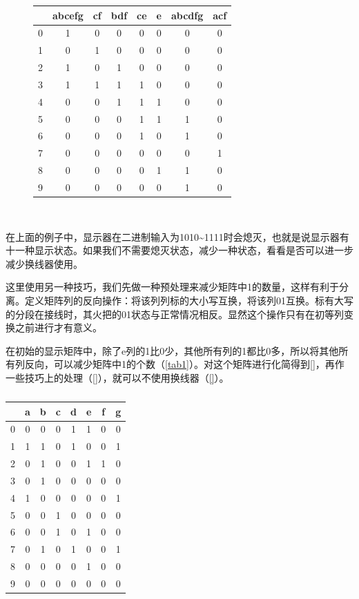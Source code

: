 \begin{figure}[p]
{\begin{tabular}{|c|ccccccc|}
&abcefg&cf&bdf&ce&e&abcdfg&acf\\\hline
0&1&0&0&0&0&0&0\\
1&0&1&0&0&0&0&0\\
2&1&0&1&0&0&0&0\\
3&1&1&1&1&0&0&0\\
4&0&0&1&1&1&0&0\\
5&0&0&0&1&1&1&0\\
6&0&0&0&1&0&1&0\\
7&0&0&0&0&0&0&1\\
8&0&0&0&0&1&1&0\\
9&0&0&0&0&0&1&0
\end{tabular}
}\\
\caption{}
\label{bianhuanp2}
\end{figure}

在上面的例子中，显示器在二进制输入为1010\~{}1111时会熄灭，也就是说显示器有十一种显示状态。如果我们不需要熄灭状态，减少一种状态，看看是否可以进一步减少换线器使用。

这里使用另一种技巧，我们先做一种预处理来减少矩阵中1的数量，这样有利于分离。定义矩阵列的反向操作：将该列列标的大小写互换，将该列01互换。标有大写的分段在接线时，其火把的01状态与正常情况相反。显然这个操作只有在初等列变换之前进行才有意义。

在初始的显示矩阵中，除了e列的1比0少，其他所有列的1都比0多，所以将其他所有列反向，可以减少矩阵中1的个数（\autoref{tab1}）。对这个矩阵进行化简得到\autoref{}，再作一些技巧上的处理（\autoref{}），就可以不使用换线器（\autoref{}）。

\begin{table}[!ht]
\centering
\begin{tabular}{c|ccccccc}
&a&b&c&d&e&f&g\\\hline
0&0&0&0&1&1&0&0\\
1&1&1&0&1&0&0&1\\
2&0&1&0&0&1&1&0\\
3&0&1&0&0&0&0&0\\
4&1&0&0&0&0&0&1\\
5&0&0&1&0&0&0&0\\
6&0&0&1&0&1&0&0\\
7&0&1&0&1&0&0&1\\
8&0&0&0&0&1&0&0\\
9&0&0&0&0&0&0&0
\end{tabular}
\caption{}\label{tab1}
\end{table}


